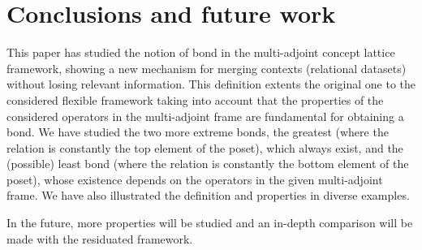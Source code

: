 \documentclass[runningheads,a4paper]{llncs}
\begin{document}


\section{Conclusions and future work}

This paper has studied the notion of bond in the multi-adjoint concept lattice framework, showing a new mechanism for merging contexts (relational datasets) without losing relevant information. This definition extents the original one to the considered flexible  framework  taking into account that the properties of the considered operators in the multi-adjoint frame are fundamental for obtaining a bond. We have studied the two more extreme bonds, the greatest (where the relation is constantly the top element of the poset), which always exist, and the (possible) least bond (where the relation is constantly the bottom element of the poset), whose existence depends on the operators in the given multi-adjoint frame. We have also illustrated the definition and properties in diverse examples. 

In the future, more properties will be studied and an in-depth comparison will be made with the residuated framework.

{\small


}
\end{document}
